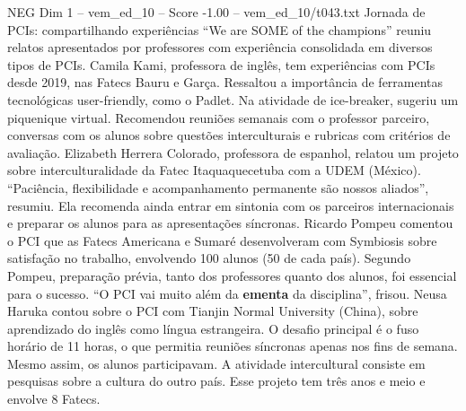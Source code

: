 \begin{textsample}{NEG Dim 1 – vem\_ed\_10 – Score -1.00 – vem\_ed\_10/t043.txt}  \label{ex:f1_neg_064}
Jornada de PCIs: compartilhando experiências “We are SOME of the champions” reuniu relatos apresentados por professores com experiência consolidada em diversos tipos de PCIs.
Camila Kami, professora de inglês, tem experiências com PCIs desde 2019, nas Fatecs Bauru e Garça.
Ressaltou a importância de ferramentas tecnológicas user-friendly, como o Padlet.
Na atividade de ice-breaker, sugeriu um piquenique virtual.
Recomendou reuniões semanais com o professor parceiro, conversas com os alunos sobre questões interculturais e rubricas com critérios de avaliação.
Elizabeth Herrera Colorado, professora de espanhol, relatou um projeto sobre interculturalidade da Fatec Itaquaquecetuba com a UDEM (México). “Paciência, flexibilidade e acompanhamento permanente são nossos aliados”, resumiu.
Ela recomenda ainda entrar em sintonia com os parceiros internacionais e preparar os alunos para as apresentações síncronas.
Ricardo Pompeu comentou o PCI que as Fatecs Americana e Sumaré desenvolveram com Symbiosis sobre satisfação no trabalho, envolvendo 100 alunos (50 de cada país).
Segundo Pompeu, preparação prévia, tanto dos professores quanto dos alunos, foi essencial para o sucesso. “O PCI vai muito além da \textbf{ementa} da disciplina”, frisou.
Neusa Haruka contou sobre o PCI com Tianjin Normal University (China), sobre aprendizado do inglês como língua estrangeira.
O desafio principal é o fuso horário de 11 horas, o que permitia reuniões síncronas apenas nos fins de semana.
Mesmo assim, os alunos participavam.
A atividade intercultural consiste em pesquisas sobre a cultura do outro país.
Esse projeto tem três anos e meio e envolve 8 Fatecs.

\end{textsample}
